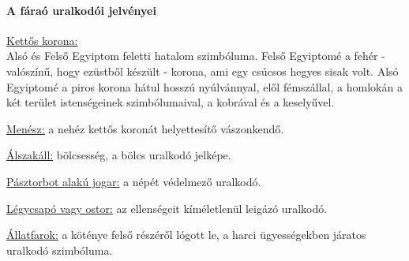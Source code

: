 \paragraph{A fáraó uralkodói jelvényei}

	\begin{compactitem}
		\item \underline{Kettős korona:}\\
		Alsó és Felső Egyiptom feletti hatalom szimbóluma. Felső Egyiptomé a fehér - valószínű, hogy ezüstből készült - korona, ami egy csúcsos hegyes sisak volt. Alsó Egyiptomé a piros korona hátul hosszú nyúlvánnyal, elől fémszállal, a homlokán a két terület istenségeinek szimbólumaival, a kobrával és a keselyűvel.
		
		\item \underline{Menész:} a nehéz kettős koronát helyettesítő vászonkendő.
		
		\item \underline{Álszakáll:} bölcsesség, a bölcs uralkodó jelképe.
		
		\item \underline{Pásztorbot alakú jogar:} a népét védelmező uralkodó.
		
		\item \underline{Légycsapó vagy ostor:} az ellenségeit kíméletlenül leigázó uralkodó.
		
		\item \underline{Állatfarok:} a köténye felső részéről lógott le, a harci ügyességekben járatos uralkodó szimbóluma.
	\end{compactitem}

